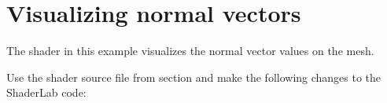 \chapter{Visualizing normal vectors}
\hypertarget{md__hey_tea_9_2_library_2_package_cache_2com_8unity_8render-pipelines_8universal_0d14_80_88_2_do93945fe33cc7a050828f7ab1184ad1b6}{}\label{md__hey_tea_9_2_library_2_package_cache_2com_8unity_8render-pipelines_8universal_0d14_80_88_2_do93945fe33cc7a050828f7ab1184ad1b6}
\label{md__hey_tea_9_2_library_2_package_cache_2com_8unity_8render-pipelines_8universal_0d14_80_88_2_do93945fe33cc7a050828f7ab1184ad1b6_autotoc_md2710}%
%
 The  shader in this example visualizes the normal vector values on the mesh.

Use the  shader source file from section  and make the following changes to the Shader\+Lab code\+:


